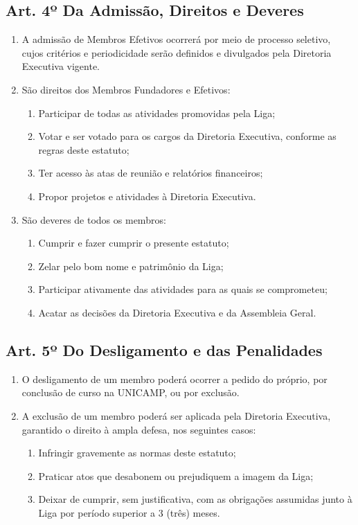 \documentclass[12pt, a4paper]{article}
\begin{document}
\subsection{Art. 4º Da Admissão, Direitos e Deveres}
\begin{enumerate}[label=\S \arabic*.]
    \item A admissão de Membros Efetivos ocorrerá por meio de processo seletivo, cujos critérios e periodicidade serão definidos e divulgados pela Diretoria Executiva vigente.
    \item São direitos dos Membros Fundadores e Efetivos:
    \begin{enumerate}[label=\alph*)]
        \item Participar de todas as atividades promovidas pela Liga;
        \item Votar e ser votado para os cargos da Diretoria Executiva, conforme as regras deste estatuto;
        \item Ter acesso às atas de reunião e relatórios financeiros;
        \item Propor projetos e atividades à Diretoria Executiva.
    \end{enumerate}
    \item São deveres de todos os membros:
    \begin{enumerate}[label=\alph*)]
        \item Cumprir e fazer cumprir o presente estatuto;
        \item Zelar pelo bom nome e patrimônio da Liga;
        \item Participar ativamente das atividades para as quais se comprometeu;
        \item Acatar as decisões da Diretoria Executiva e da Assembleia Geral.
    \end{enumerate}
\end{enumerate}

\subsection{Art. 5º Do Desligamento e das Penalidades}
\begin{enumerate}[label=\S \arabic*.]
    \item O desligamento de um membro poderá ocorrer a pedido do próprio, por conclusão de curso na UNICAMP, ou por exclusão.
    \item A exclusão de um membro poderá ser aplicada pela Diretoria Executiva, garantido o direito à ampla defesa, nos seguintes casos:
    \begin{enumerate}[label=\alph*)]
        \item Infringir gravemente as normas deste estatuto;
        \item Praticar atos que desabonem ou prejudiquem a imagem da Liga;
        \item Deixar de cumprir, sem justificativa, com as obrigações assumidas junto à Liga por período superior a 3 (três) meses.
    \end{enumerate}
\end{enumerate}
\end{document}
